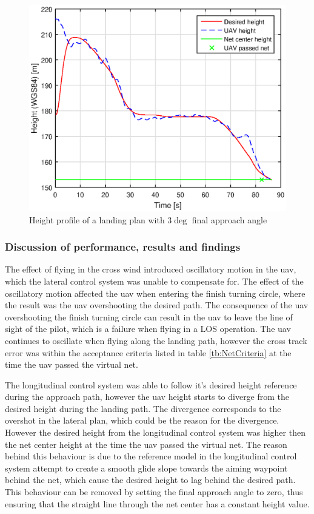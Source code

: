 \begin{figure}[H]
\centering
		\includegraphics[scale=0.7]{figs/Experiment/Height31mai103029.eps}
		\caption{Height profile of a landing plan with $3 \deg$ final approach angle}
		\label{Fig:Height31mai103029}
\end{figure}
\subsubsection{Discussion of performance, results and findings}
The effect of flying in the cross wind introduced oscillatory motion in the \gls{uav}, which the lateral control system was unable to compensate for. The effect of the oscillatory motion affected the \gls{uav} when entering the finish turning circle, where the result was the \gls{uav} overshooting the desired path. The consequence of the \gls{uav} overshooting the finish turning circle can result in the \gls{uav} to leave the line of sight of the pilot, which is a failure when flying in a LOS operation. The \gls{uav} continues to oscillate when flying along the landing path, however the cross track error was within the acceptance criteria listed in table \ref{tb:NetCriteria} at the time the \gls{uav} passed the virtual net.

The longitudinal control system was able to follow it's desired height reference during the approach path, however the \gls{uav} height starts to diverge from the desired height during the landing path. The divergence corresponds to the overshot in the lateral plan, which could be the reason for the divergence. However the desired height from the longitudinal control system was higher then the net center height at the time the \gls{uav} passed the virtual net. The reason behind this behaviour is due to the reference model in the longitudinal control system attempt to create a smooth glide slope towards the aiming waypoint behind the net, which cause the desired height to lag behind the desired path. This behaviour can be removed by setting the final approach angle to zero, thus ensuring that the straight line through the net center has a constant height value.
